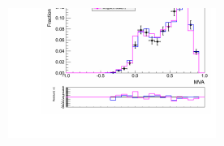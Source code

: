 \begin{figure}[!htbp]
\begin{center}
\includegraphics[width=0.49\textwidth]{figures/ShapeSystematics_WW0JetBin_MVA130_MCAtNLOScaleVariation.pdf}
\caption{
}
\label{fig:wwshape_scalevariation_MVA130_MCAtNLO}
\end{center}
\end{figure}

\begin{figure}[!htbp]
\begin{center}
\caption{
}
\label{fig:wwshape_scalevariation_MVA130_MadgrahVsMCAtNLO}
\end{center}
\end{figure}

